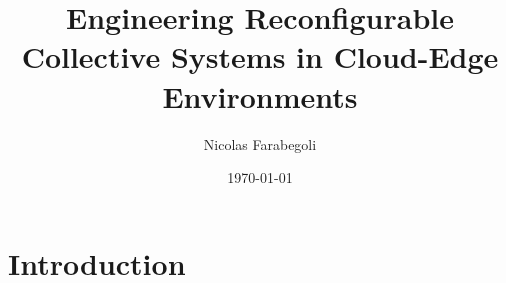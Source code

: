 \documentclass[12pt,a4paper]{article}
\title{Engineering Reconfigurable Collective Systems in Cloud-Edge Environments}
\author{Nicolas Farabegoli}
\date{\monthyeardate\today}
\begin{document}
\maketitle

\section{Introduction}\label{sec:introduction}

%
%
%
\end{document}
